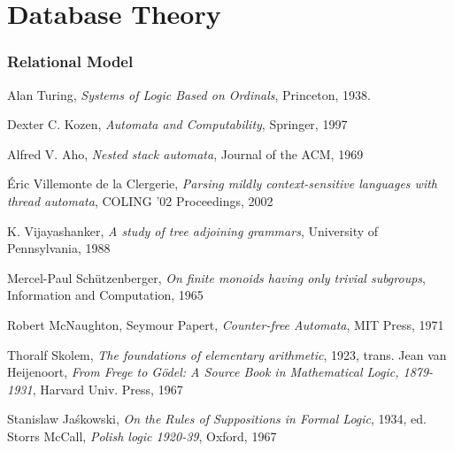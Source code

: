 \documentclass{article}
\begin{document}
\part{Database Theory}\label{sec:database_theory}

\section{Relational Model}\label{sec:relational_model}


\begin{thebibliography}{99}

    Alan Turing,
    \emph{Systems of Logic Based on Ordinals},
    Princeton,
    1938.

    Dexter C. Kozen,
    \emph{Automata and Computability},
    Springer,
    1997

    Alfred V. Aho,
    \emph{Nested stack automata},
    Journal of the ACM,
    1969

    \'Eric Villemonte de la Clergerie,
    \emph{Parsing mildly context-sensitive languages with thread automata},
    COLING '02 Proceedings,
    2002

    K. Vijayashanker,
    \emph{A study of tree adjoining grammars},
    University of Pennsylvania,
    1988

    Mercel-Paul Sch\"utzenberger,
    \emph{On finite monoids having only trivial subgroups},
    Information and Computation,
    1965

    Robert McNaughton, Seymour Papert,
    \emph{Counter-free Automata},
    MIT Press,
    1971

    Thoralf Skolem,
    \emph{The foundations of elementary arithmetic},
    1923,
    trans. Jean van Heijenoort,
    \emph{From Frege to G\"odel: A Source Book in Mathematical Logic, 1879-1931},
    Harvard Univ. Press,
    1967

    Stanislaw Ja\'skowski,
    \emph{On the Rules of Suppositions in Formal Logic},
    1934,
    ed. Storrs McCall,
    \emph{Polish logic 1920-39},
    Oxford,
    1967


\end{thebibliography}
\end{document}
